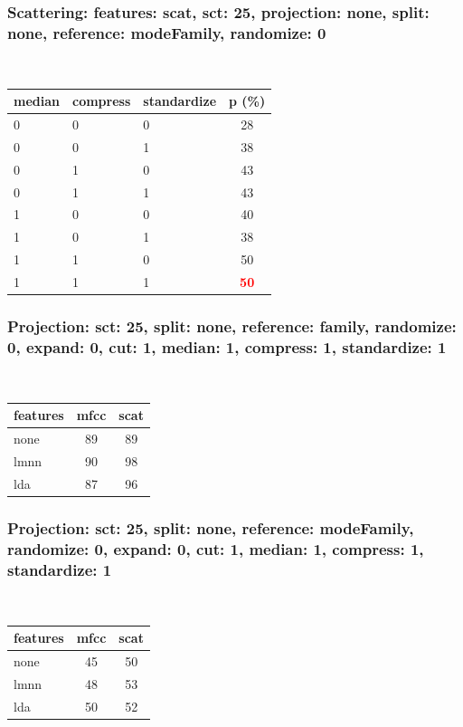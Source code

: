 \documentclass{beamer}
\begin{document}
\begin{frame}\frametitle{Scattering: features: scat, sct: 25, projection: none, split: none, reference: modeFamily, randomize: 0}

\begin{table}
\begin{center}
\
\setlength{\tabcolsep}{.16667em}
\begin{tabular}{lllc}
median & compress & standardize & p (\%) \\
\hline
0 & 0 & 0 & 28 \\
0 & 0 & 1 & 38 \\
0 & 1 & 0 & 43 \\
0 & 1 & 1 & 43 \\
1 & 0 & 0 & 40 \\
1 & 0 & 1 & 38 \\
1 & 1 & 0 & 50 \\
1 & 1 & 1 & \textbf{\textcolor{red}{50}} \\
\end{tabular}
\end{center}
\label{fescSc25PrnoSpnoRemofaRa0}
\end{table}

\end{frame}
\begin{frame}\frametitle{Projection: sct: 25, split: none, reference: family, randomize: 0, expand: 0, cut: 1, median: 1, compress: 1, standardize: 1}

\begin{table}
\begin{center}
\
\setlength{\tabcolsep}{.16667em}
\begin{tabular}{lcc}
features & mfcc & scat \\
\hline
none & 89 & 89 \\
lmnn & 90 & 98 \\
lda & 87 & 96 \\
\end{tabular}
\end{center}
\label{sc25SpnoRefaRa0Ex0Cu1Me1Co1St1}
\end{table}

\end{frame}
\begin{frame}\frametitle{Projection: sct: 25, split: none, reference: modeFamily, randomize: 0, expand: 0, cut: 1, median: 1, compress: 1, standardize: 1}

\begin{table}
\begin{center}
\
\setlength{\tabcolsep}{.16667em}
\begin{tabular}{lcc}
features & mfcc & scat \\
\hline
none & 45 & 50 \\
lmnn & 48 & 53 \\
lda & 50 & 52 \\
\end{tabular}
\end{center}
\label{sc25SpnoRemofaRa0Ex0Cu1Me1Co1St1}
\end{table}

\end{frame}
\end{document}
